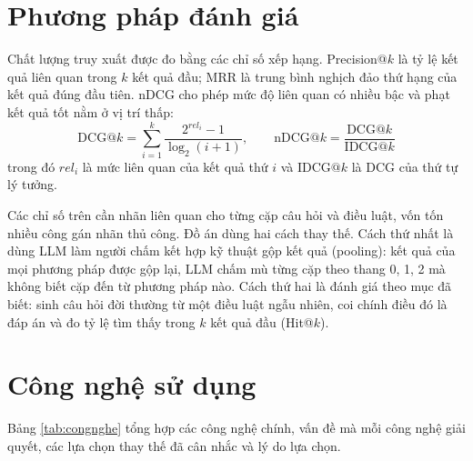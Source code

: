 \documentclass[../DoAn.tex]{subfiles}
\begin{document}
\section{Phương pháp đánh giá}
\label{section:3.5}
Chất lượng truy xuất được đo bằng các chỉ số xếp hạng. Precision@$k$ là tỷ lệ kết quả liên quan trong $k$ kết quả đầu; MRR là trung bình nghịch đảo thứ hạng của kết quả đúng đầu tiên. nDCG \cite{jarvelin2002ndcg} cho phép mức độ liên quan có nhiều bậc và phạt kết quả tốt nằm ở vị trí thấp:
\begin{equation}\label{eq:ndcg}
    \mathrm{DCG}@k = \sum_{i=1}^{k} \frac{2^{rel_i}-1}{\log_2(i+1)}, \qquad \mathrm{nDCG}@k = \frac{\mathrm{DCG}@k}{\mathrm{IDCG}@k}
\end{equation}
trong đó $rel_i$ là mức liên quan của kết quả thứ $i$ và $\mathrm{IDCG}@k$ là DCG của thứ tự lý tưởng.

Các chỉ số trên cần nhãn liên quan cho từng cặp câu hỏi và điều luật, vốn tốn nhiều công gán nhãn thủ công. Đồ án dùng hai cách thay thế. Cách thứ nhất là dùng LLM làm người chấm \cite{zheng2023judge} kết hợp kỹ thuật gộp kết quả (pooling): kết quả của mọi phương pháp được gộp lại, LLM chấm mù từng cặp theo thang 0, 1, 2 mà không biết cặp đến từ phương pháp nào. Cách thứ hai là đánh giá theo mục đã biết: sinh câu hỏi đời thường từ một điều luật ngẫu nhiên, coi chính điều đó là đáp án và đo tỷ lệ tìm thấy trong $k$ kết quả đầu (Hit@$k$).

\section{Công nghệ sử dụng}
\label{section:3.6}
Bảng \ref{tab:congnghe} tổng hợp các công nghệ chính, vấn đề mà mỗi công nghệ giải quyết, các lựa chọn thay thế đã cân nhắc và lý do lựa chọn.
\end{document}
